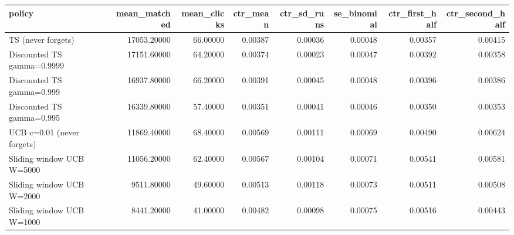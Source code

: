 \begin{tabular}{lrrrrrrr}
\toprule
policy & mean\_matched & mean\_clicks & ctr\_mean & ctr\_sd\_runs & se\_binomial & ctr\_first\_half & ctr\_second\_half \\
\midrule
TS (never forgets) & 17053.20000 & 66.00000 & 0.00387 & 0.00036 & 0.00048 & 0.00357 & 0.00415 \\
Discounted TS gamma=0.9999 & 17151.60000 & 64.20000 & 0.00374 & 0.00023 & 0.00047 & 0.00392 & 0.00358 \\
Discounted TS gamma=0.999 & 16937.80000 & 66.20000 & 0.00391 & 0.00045 & 0.00048 & 0.00396 & 0.00386 \\
Discounted TS gamma=0.995 & 16339.80000 & 57.40000 & 0.00351 & 0.00041 & 0.00046 & 0.00350 & 0.00353 \\
UCB c=0.01 (never forgets) & 11869.40000 & 68.40000 & 0.00569 & 0.00111 & 0.00069 & 0.00490 & 0.00624 \\
Sliding window UCB W=5000 & 11056.20000 & 62.40000 & 0.00567 & 0.00104 & 0.00071 & 0.00541 & 0.00581 \\
Sliding window UCB W=2000 & 9511.80000 & 49.60000 & 0.00513 & 0.00118 & 0.00073 & 0.00511 & 0.00508 \\
Sliding window UCB W=1000 & 8441.20000 & 41.00000 & 0.00482 & 0.00098 & 0.00075 & 0.00516 & 0.00443 \\
\bottomrule
\end{tabular}
